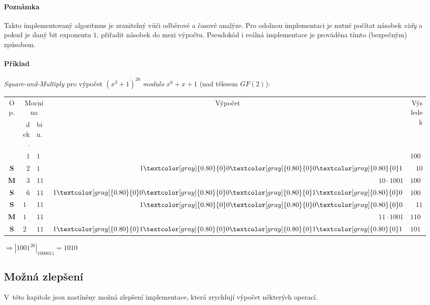 \documentclass[thesis=M,czech,hidelinks]{FITthesis}[2012/06/26]
\newcommand{\0}{{\textcolor[gray]{0.80}{0}}}
\begin{document}
\paragraph{Poznámka} Takto implementovaný algoritmus je zranitelný vůči odběrové
a časové analýze. Pro odolnou implementaci je nutné počítat násobek \emph{vždy}
a pokud je daný bit exponentu $1$, přiřadit násobek do mezi výpočtu. Pseudokód
i reálná implementace je prováděna tímto (bezpečným) způsobem.

\paragraph{Příklad} \emph{Square-and-Multiply} pro výpočet
$\left(x^3+1\right)^{26}$ \emph{modulo} $x^6+x+1$ (nad tělesem $GF(2)$):

\begin{center}
    \begin{tabular}{c|r|l|r|r}
        \multirow{2}{*}{Op.} & \multicolumn{2}{c}{Mocnina} & \multicolumn{1}{c}{\multirow{2}{*}{Výpočet}} & \multirow{2}{*}{Výsledek} \\
                &  dek. & bin.    &                   &              \\
        \hline
        \hline
                & $  1$ & $1    $ &                   & $ 1001$      \\
        \hline
    \textbf{S}  & $  2$ & $1    $ & $    1\00\00\01 $ & $   10$      \\
    \textbf{M}  & $  3$ & $11   $ & $ 10 \cdot 1001 $ & $10010$      \\
        \hline
    \textbf{S}  & $  6$ & $110  $ & $ 1\00\00\01\00 $ & $ 1000$      \\
        \hline
    \textbf{S}  & $ 12$ & $1100 $ & $    1\00\00\00 $ & $   11$      \\
    \textbf{M}  & $ 13$ & $1101 $ & $ 11 \cdot 1001 $ & $11011$      \\
        \hline
    \textbf{S}  & $ 26$ & $11010$ & $     1\01\00\01\01 $ & $ 1010$      \\
    \end{tabular}
\end{center}
$ \Rightarrow \left|1001^{26}\right|_{1000011} = 1010 $

\subsection{Možná zlepšení}
V~této kapitole jsou nastíněny možná zlepšení implementace, která
zrychlují výpočet některých operací.
\end{document}
